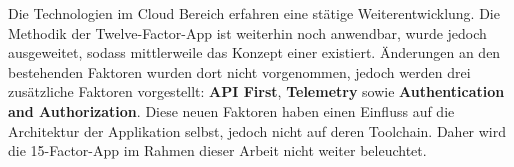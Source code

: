 Die Technologien im Cloud Bereich erfahren eine stätige Weiterentwicklung. Die Methodik der Twelve-Factor-App ist weiterhin noch anwendbar, wurde jedoch ausgeweitet, sodass mittlerweile das Konzept einer  existiert. Änderungen an den bestehenden Faktoren wurden dort nicht vorgenommen, jedoch werden drei zusätzliche Faktoren vorgestellt: \textbf{API First}, \textbf{Telemetry} sowie \textbf{Authentication and Authorization}. \cite{104:15-Factor-Cloud-native-Java-Applications} Diese neuen Faktoren haben einen Einfluss auf die Architektur der Applikation selbst, jedoch nicht auf deren Toolchain. Daher wird die 15-Factor-App im Rahmen dieser Arbeit nicht weiter beleuchtet.
